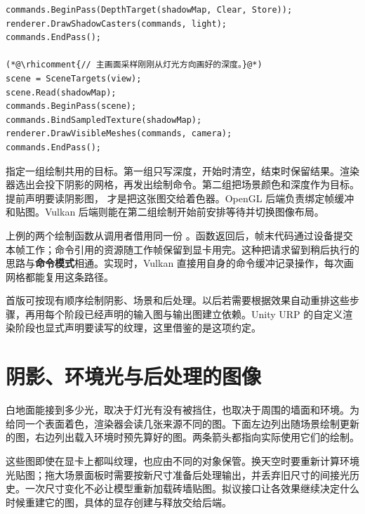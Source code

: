 \begin{lstlisting}
commands.BeginPass(DepthTarget(shadowMap, Clear, Store));
renderer.DrawShadowCasters(commands, light);
commands.EndPass();

(*@\rhicomment{// 主画面采样刚刚从灯光方向画好的深度。}@*)
scene = SceneTargets(view);
scene.Read(shadowMap);
commands.BeginPass(scene);
commands.BindSampledTexture(shadowMap);
renderer.DrawVisibleMeshes(commands, camera);
commands.EndPass();
\end{lstlisting}

 指定一组绘制共用的目标。第一组只写深度，开始时清空，结束时保留结果。渲染器选出会投下阴影的网格，再发出绘制命令。第二组把场景颜色和深度作为目标。 提前声明要读阴影图， 才是把这张图交给着色器。OpenGL 后端负责绑定帧缓冲和贴图。Vulkan 后端则能在第二组绘制开始前安排等待并切换图像布局。

上例的两个绘制函数从调用者借用同一份 。函数返回后，帧末代码通过设备提交本帧工作；命令引用的资源随工作帧保留到显卡用完。这种把请求留到稍后执行的思路与\textbf{命令模式}相通。实现时，Vulkan 直接用自身的命令缓冲记录操作，每次画网格都能复用这条路径。

首版可按现有顺序绘制阴影、场景和后处理。以后若需要根据效果自动重排这些步骤，再用每个阶段已经声明的输入图与输出图建立依赖。Unity URP 的自定义渲染阶段也显式声明要读写的纹理，这里借鉴的是这项约定。

\clearpage
\section{阴影、环境光与后处理的图像}
白地面能接到多少光，取决于灯光有没有被挡住，也取决于周围的墙面和环境。为给同一个表面着色，渲染器会读几张来源不同的图。下面左边列出随场景绘制更新的图，右边列出载入环境时预先算好的图。两条箭头都指向实际使用它们的绘制。


这些图即使在显卡上都叫纹理，也应由不同的对象保管。换天空时要重新计算环境光贴图；拖大场景面板时需要按新尺寸准备后处理输出，并丢弃旧尺寸的间接光历史。一次尺寸变化不必让模型重新加载砖墙贴图。拟议接口让各效果继续决定什么时候重建它的图，具体的显存创建与释放交给后端。

